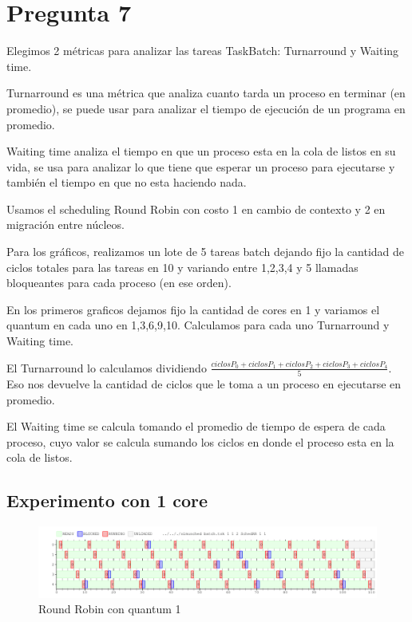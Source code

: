 \section{Pregunta 7}



Elegimos 2 métricas para analizar las tareas TaskBatch: Turnarround y Waiting time.

Turnarround es una métrica que analiza cuanto tarda un proceso en terminar (en promedio), se puede usar para analizar el tiempo de ejecución de un programa en promedio.

Waiting time analiza el tiempo en que un proceso esta en la cola de listos en su vida, se usa para analizar lo que tiene que esperar un proceso para ejecutarse y también el tiempo en que no esta haciendo nada.

Usamos el scheduling Round Robin con costo 1 en cambio de contexto y 2 en migración entre núcleos. 

Para los gráficos, realizamos un lote de 5 tareas batch dejando fijo la cantidad de ciclos totales para las tareas en 10 y variando entre 1,2,3,4 y 5 llamadas bloqueantes para cada proceso (en ese orden).

En los primeros graficos dejamos fijo la cantidad de cores en 1 y variamos el quantum en cada uno en 1,3,6,9,10. Calculamos para cada uno Turnarround y Waiting time.

El Turnarround lo calculamos dividiendo $\frac{ciclosP_0 + ciclosP_1 + ciclosP_2 + ciclosP_3 + ciclosP_4 }{5}$. Eso nos devuelve la cantidad de ciclos que le toma a un proceso en ejecutarse en promedio.

El Waiting time se calcula tomando el promedio de tiempo de espera de cada proceso, cuyo valor se calcula sumando los ciclos en donde el proceso esta en la cola de listos.

\subsection{Experimento con 1 core}

\begin{figure}[H]
\begin{center}
\includegraphics[width=1.1\textwidth]{img/core1q1.png}
     \caption{Round Robin con quantum 1}
\end{center}
\end{figure}

